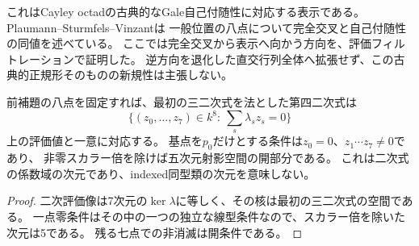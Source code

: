 \begin{remark}[古典的な自己付随八点との関係]
これはCayley octadの古典的なGale自己付随性に対応する表示である。
Plaumann--Sturmfels--Vinzant\cite[Theorem 3.10]{PSVQuartics}は
一般位置の八点について完全交叉と自己付随性の同値を述べている。
ここでは完全交叉から表示へ向かう方向を、評価フィルトレーションで証明した。
逆方向を退化した直交行列全体へ拡張せず、この古典的正規形そのものの新規性は主張しない。
\end{remark}

\begin{corollary}[最後の二次式の全係数域]\label{cor:octad-last-quadric-values}
前補題の八点を固定すれば、最初の三二次式を法とした第四二次式は
\[
 \{(z_0,\ldots,z_7)\in k^8:\ \sum_s\lambda_sz_s=0\}
\]
上の評価値と一意に対応する。
基点を$p_0$だけとする条件は$z_0=0$、$z_1\cdots z_7\ne0$であり、
非零スカラー倍を除けば五次元射影空間の開部分である。
これは二次式の係数域の次元であり、indexed同型類の次元を意味しない。
\end{corollary}
\begin{proof}
二次評価像は7次元の$\ker\lambda$に等しく、その核は最初の三二次式の空間である。
一点零条件はその中の一つの独立な線型条件なので、スカラー倍を除いた次元は5である。
残る七点での非消滅は開条件である。
\end{proof}

